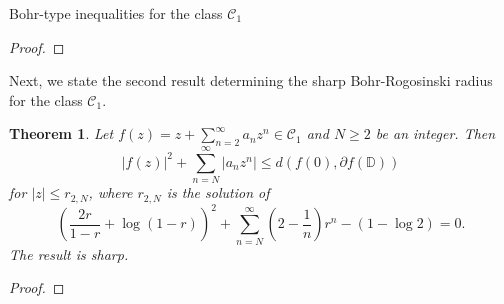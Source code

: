 \documentclass[12pt,a4paper,reqno]{amsart}
\theoremstyle{definition}
\theoremstyle{plain}
\newtheorem{theorem}[definition]{Theorem}
\numberwithin{equation}{section}
\begin{document}
\begin{section}{Bohr-type inequalities for the class $\mathcal{C}_1$}
\begin{proof}
\end{proof}
\noindent
Next, we state the second result determining the sharp Bohr-Rogosinski radius for the class $\mathcal{C}_1$.
\begin{theorem}\label{th4}
Let $f(z)=z + \sum_{n=2}^{\infty} a_n z^n \in \mathcal{C}_1$ and $N\geq2$ be an integer. Then
\begin{equation} \label{2.1.4}
|f(z)|^2+ \sum_{n=N}^{\infty} |a_n z^n|  \le d(f(0), \partial{f(\mathbb{D})})
\end{equation}
for $|z| \le r_{2,N}$, where $r_{2,N}$ is the solution of
\begin{equation*}
\left(\frac{2r}{1-r} +\log(1-r) \right)^2 + \sum_{n=N}^{\infty} \left( 2-\frac{1}{n} \right) r^{n}- (1 - \log{2})=0.
\end{equation*}
The result is sharp.
\end{theorem}
\begin{proof}

\end{proof}
\end{section}
\end{document}
